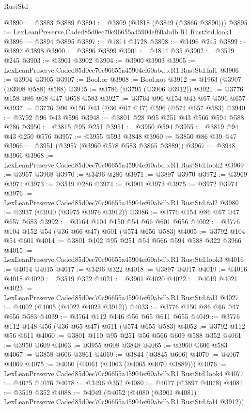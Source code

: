\begin{lexlean}{RustStd}
\begin{coremodule}
@3890 := @3883 @3889
@3894 := @3809 (@3818 (@3849 (@3866 @3890)))
@3895 := LexLeanPreserve.Caded85d0ec70c96655a45904ef60abdb.R1.RustStd.look1
@3896 := @3894 @3895
@3897 := @1814 @1728
@3898 := @3496 @245
@3899 := @3897 @3898
@3900 := @3896 @3899
@3901 := @1814 @35
@3902 := @3519 @245
@3903 := @3901 @3902
@3904 := @3900 @3903
@3905 := LexLeanPreserve.Caded85d0ec70c96655a45904ef60abdb.R1.RustStd.fal1
@3906 := @3904 @3905
@3907 := Bool.or
@3908 := Bool.not
@3912 := @1963 (@3907 (@3908 @588) @588)
@3915 := @3786 (@3795 (@3906 @3912))
@3921 := @3776 @158 @86 @68 @47 @658 @583
@3927 := @3764 @96 @154 @43 @67 @596 @657
@3937 := @3776 @96 @156 @43 (@36 @67 @47) @596 (@574 @657 @583)
@3940 := @3792 @96 @43 @596
@3948 := @3801 @28 @95 @251 @43 @566 @594 @588 @286
@3950 := @3815 @95 @251
@3951 := @3950 @594
@3955 := @3819 @94 @43 @250 @576
@3957 := @3955 @593 @3848
@3960 := @3850 @86 @39 @47
@3966 := @3951 (@3957 (@3960 @578 @583 @3865 @3889))
@3967 := @3948 @3966
@3968 := LexLeanPreserve.Caded85d0ec70c96655a45904ef60abdb.R1.RustStd.look2
@3969 := @3967 @3968
@3970 := @3496 @286
@3971 := @3897 @3970
@3972 := @3969 @3971
@3973 := @3519 @286
@3974 := @3901 @3973
@3975 := @3972 @3974
@3976 := LexLeanPreserve.Caded85d0ec70c96655a45904ef60abdb.R1.RustStd.fal2
@3980 := @3937 (@3940 (@3975 @3976 @3912))
@3986 := @3776 @154 @86 @67 @47 @657 @583
@3992 := @3764 @104 @150 @54 @66 @601 @656
@4002 := @3776 @104 @152 @54 (@36 @66 @47) @601 (@574 @656 @583)
@4005 := @3792 @104 @54 @601
@4014 := @3801 @102 @95 @251 @54 @566 @594 @588 @322 @3966
@4015 := LexLeanPreserve.Caded85d0ec70c96655a45904ef60abdb.R1.RustStd.look3
@4016 := @4014 @4015
@4017 := @3496 @322
@4018 := @3897 @4017
@4019 := @4016 @4018
@4020 := @3519 @322
@4021 := @3901 @4020
@4022 := @4019 @4021
@4023 := LexLeanPreserve.Caded85d0ec70c96655a45904ef60abdb.R1.RustStd.fal3
@4027 := @4002 (@4005 (@4022 @4023 @3912))
@4033 := @3776 @150 @86 @66 @47 @656 @583
@4039 := @3764 @112 @146 @56 @65 @611 @655
@4049 := @3776 @112 @148 @56 (@36 @65 @47) @611 (@574 @655 @583)
@4052 := @3792 @112 @56 @611
@4060 := @3801 @110 @95 @251 @56 @566 @609 @588 @352
@4061 := @3950 @609
@4063 := @3955 @608 @3848
@4065 := @3960 @606 @583
@4067 := @3858 @606 @3861
@4069 := @3844 (@3845 @606)
@4070 := @4067 @4069
@4075 := @4060 (@4061 (@4063 (@4065 @4070 @3889)))
@4076 := LexLeanPreserve.Caded85d0ec70c96655a45904ef60abdb.R1.RustStd.look4
@4077 := @4075 @4076
@4078 := @3496 @352
@4080 := @4077 (@3897 @4078)
@4081 := @3519 @352
@4088 := @4049
    (@4052
      (@4080 (@3901 @4081) LexLeanPreserve.Caded85d0ec70c96655a45904ef60abdb.R1.RustStd.fal4 @3912))

\end{coremodule}
\end{lexlean}

